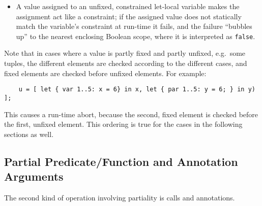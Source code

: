 \documentclass[10pt]{scrartcl}
\begin{document}
\begin{itemize}
%
\item
    A value assigned to an unfixed, constrained let-local variable makes the
    assignment act like a constraint;  if the assigned value does not
    statically match the variable's constraint at run-time it fails, and the
    failure ``bubbles up'' to the nearest enclosing Boolean scope, where it
    is interpreted as \texttt{false}.

\end{itemize}

Note that in cases where a value is partly fixed and partly unfixed, e.g.~some
tuples, the different elements are checked according to the different cases,
and fixed elements are checked before unfixed elements.  For example:
\begin{verbatim}
    u = [ let { var 1..5: x = 6} in x, let { par 1..5: y = 6; } in y) ];
\end{verbatim}
This causes a run-time abort, because the second, fixed element is checked
before the first, unfixed element.  This ordering is true for the cases in the
following sections as well.  


\subsection{Partial Predicate/Function and Annotation Arguments}
The second kind of operation involving partiality is calls and annotations.
%
\end{document}
